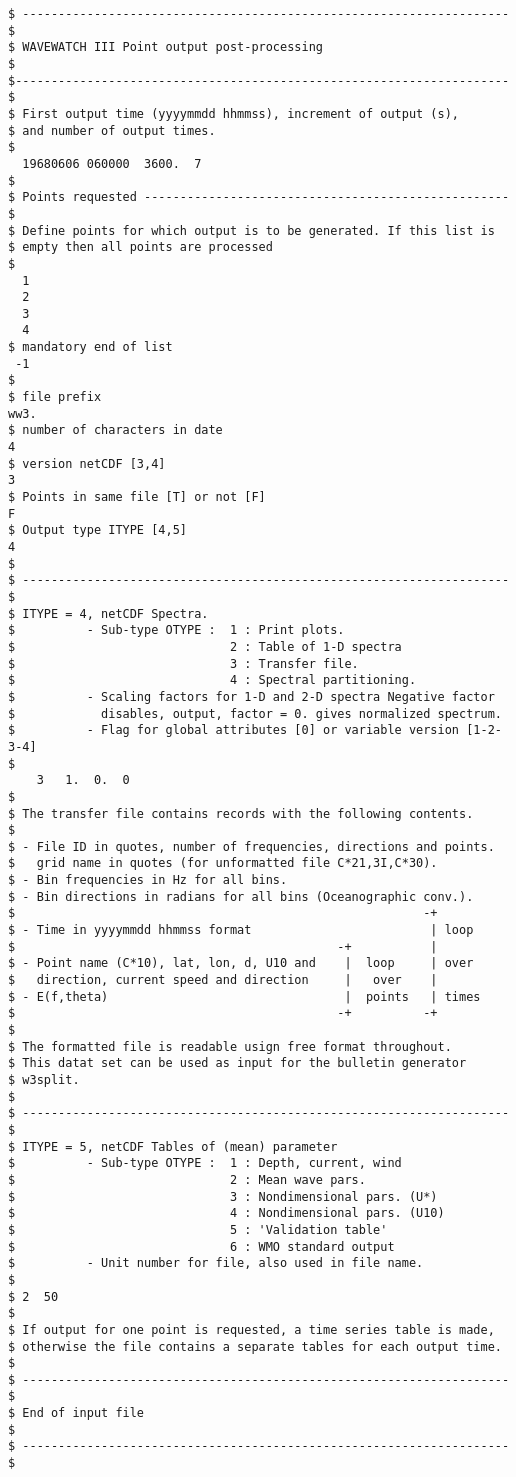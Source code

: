 \begin{verbatim}
$ -------------------------------------------------------------------- $
$ WAVEWATCH III Point output post-processing                           $
$--------------------------------------------------------------------- $
$ First output time (yyyymmdd hhmmss), increment of output (s), 
$ and number of output times.
$
  19680606 060000  3600.  7
$
$ Points requested --------------------------------------------------- $
$ Define points for which output is to be generated. If this list is 
$ empty then all points are processed
$
  1
  2
  3
  4
$ mandatory end of list
 -1
$
$ file prefix
ww3.
$ number of characters in date
4 
$ version netCDF [3,4]
3
$ Points in same file [T] or not [F]
F
$ Output type ITYPE [4,5]
4
$
$ -------------------------------------------------------------------- $
$ ITYPE = 4, netCDF Spectra.
$          - Sub-type OTYPE :  1 : Print plots.
$                              2 : Table of 1-D spectra
$                              3 : Transfer file.
$                              4 : Spectral partitioning.
$          - Scaling factors for 1-D and 2-D spectra Negative factor
$            disables, output, factor = 0. gives normalized spectrum.
$          - Flag for global attributes [0] or variable version [1-2-3-4]
$
    3   1.  0.  0  
$
$ The transfer file contains records with the following contents.
$
$ - File ID in quotes, number of frequencies, directions and points.
$   grid name in quotes (for unformatted file C*21,3I,C*30).
$ - Bin frequencies in Hz for all bins.
$ - Bin directions in radians for all bins (Oceanographic conv.).
$                                                         -+
$ - Time in yyyymmdd hhmmss format                         | loop
$                                             -+           |
$ - Point name (C*10), lat, lon, d, U10 and    |  loop     | over
$   direction, current speed and direction     |   over    |
$ - E(f,theta)                                 |  points   | times
$                                             -+          -+
$
$ The formatted file is readable usign free format throughout.
$ This datat set can be used as input for the bulletin generator
$ w3split.
$
$ -------------------------------------------------------------------- $
$ ITYPE = 5, netCDF Tables of (mean) parameter
$          - Sub-type OTYPE :  1 : Depth, current, wind
$                              2 : Mean wave pars.
$                              3 : Nondimensional pars. (U*)
$                              4 : Nondimensional pars. (U10)
$                              5 : 'Validation table'
$                              6 : WMO standard output 
$          - Unit number for file, also used in file name.
$
$ 2  50
$
$ If output for one point is requested, a time series table is made,
$ otherwise the file contains a separate tables for each output time.
$
$ -------------------------------------------------------------------- $
$ End of input file                                                    $
$ -------------------------------------------------------------------- $
\end{verbatim}
